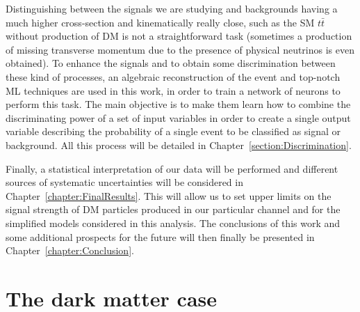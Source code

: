 \documentclass[a4paper, 10pt, openright]{report}
\begin{document}
Distinguishing between the signals we are studying and backgrounds having a much higher cross-section and kinematically really close, such as the \ac{SM} $t \bar t$ without production of \ac{DM} is not a straightforward task (sometimes a production of missing transverse momentum due to the presence of physical neutrinos is even obtained). To enhance the signals and to obtain some discrimination between these kind of processes, an algebraic reconstruction of the event and top-notch \ac{ML} techniques are used in this work, in order to train a network of neurons to perform this task. The main objective is to make them learn how to combine the discriminating power of a set of input variables in order to create a single output variable describing the probability of a single event to be classified as signal or background. All this process will be detailed in Chapter~\ref{section:Discrimination}.

Finally, a statistical interpretation of our data will be performed and different sources of systematic uncertainties will be considered in Chapter~\ref{chapter:FinalResults}. This will allow us to set upper limits on the signal strength of \ac{DM} particles produced in our particular channel and for the simplified models considered in this analysis. The conclusions of this work and some additional prospects for the future will then finally be presented in Chapter~\ref{chapter:Conclusion}.


\clearpage
\thispagestyle{empty}
\phantom{a}
\vfill
\newpage




































\chapter{The dark matter case}\label{chapter:Case}
\end{document}
